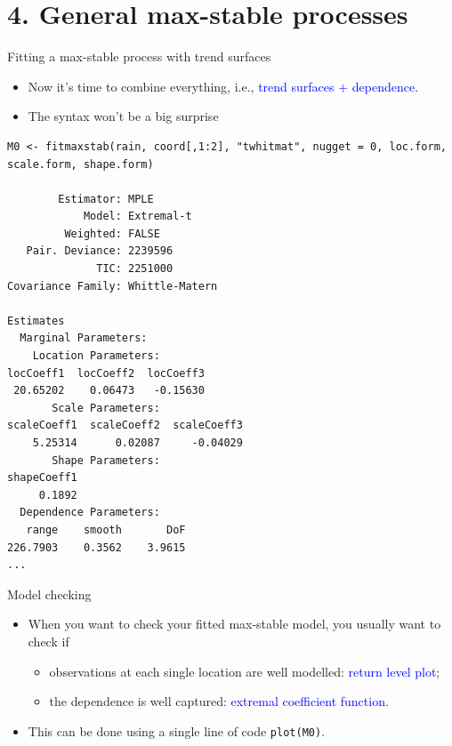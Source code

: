 \documentclass[blackslide,style=simple]{powerdot}
\theoremstyle{plain}%
\theoremstyle{definition}
\theoremstyle{remark}
\begin{document}
\section{4. General max-stable processes}

\begin{wideslide}[toc=Fitting,method=direct]{Fitting a max-stable process with trend
    surfaces}
  \begin{itemize}
  \item Now it's time to combine everything, i.e.,
    \textcolor{blue}{trend surfaces + dependence}.
  \item The syntax won't be a big surprise
  \end{itemize}
  {\tiny
\begin{verbatim}
M0 <- fitmaxstab(rain, coord[,1:2], "twhitmat", nugget = 0, loc.form, scale.form, shape.form)

        Estimator: MPLE 
            Model: Extremal-t 
         Weighted: FALSE 
   Pair. Deviance: 2239596 
              TIC: 2251000 
Covariance Family: Whittle-Matern 

Estimates
  Marginal Parameters:
    Location Parameters:
locCoeff1  locCoeff2  locCoeff3  
 20.65202    0.06473   -0.15630  
       Scale Parameters:
scaleCoeff1  scaleCoeff2  scaleCoeff3  
    5.25314      0.02087     -0.04029  
       Shape Parameters:
shapeCoeff1  
     0.1892  
  Dependence Parameters:
   range    smooth       DoF  
226.7903    0.3562    3.9615  
...
\end{verbatim}
}
\end{wideslide}

\begin{wideslide}{Model checking}
  \begin{minipage}[l]{.49\linewidth}
    \begin{itemize}
    \item When you want to check your fitted max-stable model, you
      usually want to check if
      \begin{itemize}
      \item observations at each single location are well modelled:
        \textcolor{blue}{return level plot};
      \item the dependence is well captured: \textcolor{blue}{extremal
          coefficient function}.
      \end{itemize}
    \item This can be done using a single line of code
      \texttt{plot(M0)}.
    \end{itemize}
  \end{minipage}
  \hfill
\end{wideslide}
\end{document}
